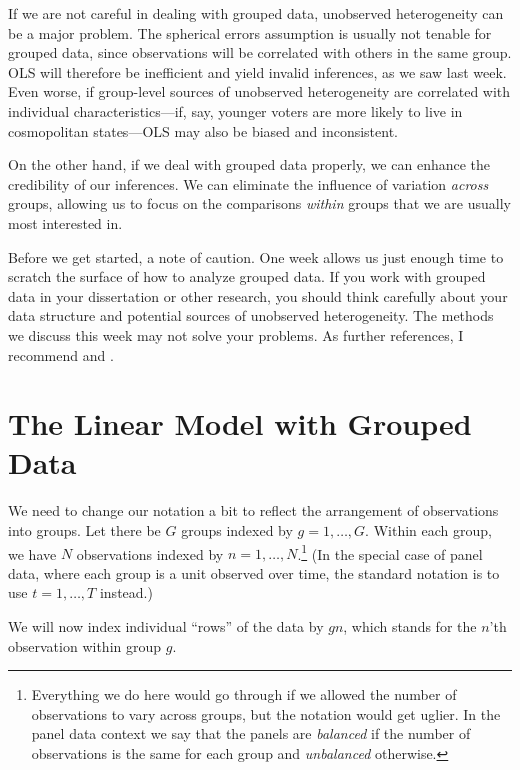 \documentclass[12pt,oneside,openany]{book}
\let\rmarkdownfootnote\footnote%
\def\footnote{\protect\rmarkdownfootnote}
\begin{document}
If we are not careful in dealing with grouped data, unobserved
heterogeneity can be a major problem. The spherical errors assumption is
usually not tenable for grouped data, since observations will be
correlated with others in the same group. OLS will therefore be
inefficient and yield invalid inferences, as we saw last week. Even
worse, if group-level sources of unobserved heterogeneity are correlated
with individual characteristics---if, say, younger voters are more
likely to live in cosmopolitan states---OLS may also be biased and
inconsistent.

On the other hand, if we deal with grouped data properly, we can enhance
the credibility of our inferences. We can eliminate the influence of
variation \emph{across} groups, allowing us to focus on the comparisons
\emph{within} groups that we are usually most interested in.

Before we get started, a note of caution. One week allows us just enough
time to scratch the surface of how to analyze grouped data. If you work
with grouped data in your dissertation or other research, you should
think carefully about your data structure and potential sources of
unobserved heterogeneity. The methods we discuss this week may not solve
your problems. As further references, I recommend
\citet{Wooldridge:2002vr} and \citet{gelman2006data}.

\section{The Linear Model with Grouped
Data}\label{the-linear-model-with-grouped-data}

We need to change our notation a bit to reflect the arrangement of
observations into groups. Let there be \(G\) groups indexed by
\(g = 1, \ldots, G\). Within each group, we have \(N\) observations
indexed by \(n = 1, \ldots, N\).\footnote{Everything we do here would go
  through if we allowed the number of observations to vary across
  groups, but the notation would get uglier. In the panel data context
  we say that the panels are \emph{balanced} if the number of
  observations is the same for each group and \emph{unbalanced}
  otherwise.} (In the special case of panel data, where each group is a
unit observed over time, the standard notation is to use
\(t = 1, \ldots, T\) instead.)

We will now index individual ``rows'' of the data by \(gn\), which
stands for the \(n\)'th observation within group \(g\).
\end{document}

